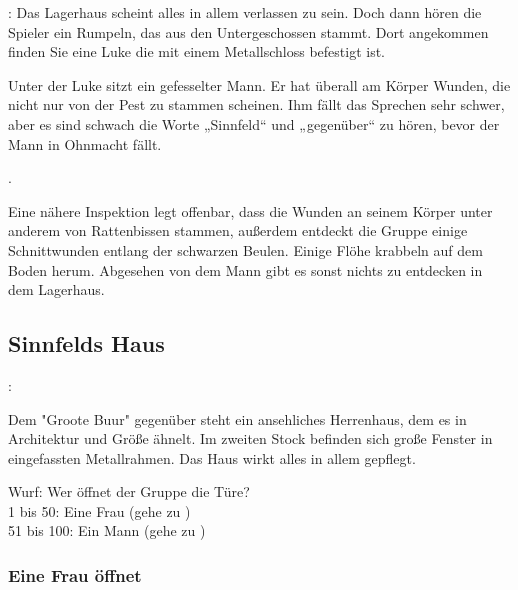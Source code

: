 : Das Lagerhaus scheint alles in allem verlassen zu sein. Doch dann hören die Spieler ein Rumpeln, das aus den Untergeschossen stammt. Dort angekommen finden Sie eine Luke die mit einem Metallschloss befestigt ist.


Unter der Luke sitzt ein gefesselter Mann. Er hat überall am Körper Wunden, die nicht nur von der Pest zu stammen scheinen. Ihm fällt das Sprechen sehr schwer, aber es sind schwach die Worte „Sinnfeld“ und „gegenüber“ zu hören, bevor der Mann in Ohnmacht fällt.

.

Eine nähere Inspektion legt offenbar, dass die Wunden an seinem Körper unter anderem von Rattenbissen stammen, außerdem entdeckt die Gruppe einige Schnittwunden entlang der schwarzen Beulen. Einige Flöhe krabbeln auf dem Boden herum. Abgesehen von dem Mann gibt es sonst nichts zu entdecken in dem Lagerhaus.

\subsection*{Sinnfelds Haus}
\label{sinnfelds haus}
:

Dem "Groote Buur" gegenüber steht ein ansehliches Herrenhaus, dem es in Architektur und Größe ähnelt. Im zweiten Stock befinden sich große Fenster in eingefassten Metallrahmen. Das Haus wirkt alles in allem gepflegt.


\begin{tcolorbox}
  Wurf: Wer öffnet der Gruppe die Türe? \\
  1 bis 50: Eine Frau (gehe zu \blue{\ref{frau öffnet}}) \\
  51 bis 100: Ein Mann (gehe zu \blue{\ref{sinnfeld öffnet}}) \\
\end{tcolorbox}

\subsubsection{Eine Frau öffnet}
\label{frau öffnet}

